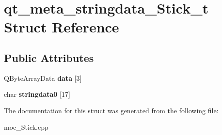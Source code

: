 \hypertarget{structqt__meta__stringdata__Stick__t}{}\section{qt\+\_\+meta\+\_\+stringdata\+\_\+\+Stick\+\_\+t Struct Reference}
\label{structqt__meta__stringdata__Stick__t}
\subsection*{Public Attributes}
\begin{DoxyCompactItemize}
\item 
Q\+Byte\+Array\+Data {\bfseries data} \mbox{[}3\mbox{]}\hypertarget{structqt__meta__stringdata__Stick__t_a8c904ea533bdcfa306d2ee65cb452e6c}{}\label{structqt__meta__stringdata__Stick__t_a8c904ea533bdcfa306d2ee65cb452e6c}

\item 
char {\bfseries stringdata0} \mbox{[}17\mbox{]}\hypertarget{structqt__meta__stringdata__Stick__t_a91298ca835d69bec7d6899991ee5a6c2}{}\label{structqt__meta__stringdata__Stick__t_a91298ca835d69bec7d6899991ee5a6c2}

\end{DoxyCompactItemize}


The documentation for this struct was generated from the following file\+:\begin{DoxyCompactItemize}
\item 
moc\+\_\+\+Stick.\+cpp\end{DoxyCompactItemize}
